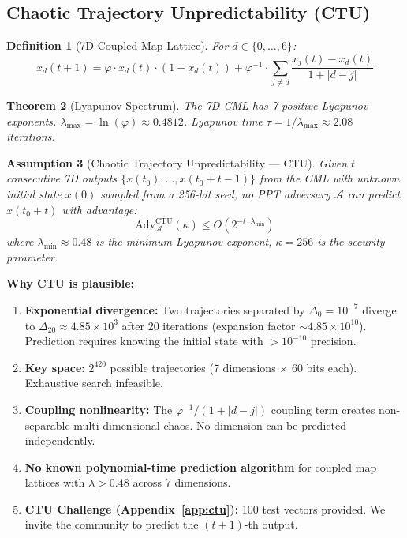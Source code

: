 \documentclass[11pt,a4paper]{article}
\newtheorem{theorem}{Theorem}[section]
\newtheorem{definition}[theorem]{Definition}
\newtheorem{assumption}[theorem]{Assumption}
\begin{document}
\subsection{Chaotic Trajectory Unpredictability (CTU)}

\begin{definition}[7D Coupled Map Lattice]
For $d \in \{0, \ldots, 6\}$:
\[
x_d(t+1) = \varphi \cdot x_d(t) \cdot (1 - x_d(t)) + \varphi^{-1} \cdot \sum_{j \neq d} \frac{x_j(t) - x_d(t)}{1 + |d - j|}
\]
\end{definition}

\begin{theorem}[Lyapunov Spectrum]
The 7D CML has 7 positive Lyapunov exponents. $\lambda_{\max} = \ln(\varphi) \approx 0.4812$. Lyapunov time $\tau = 1/\lambda_{\max} \approx 2.08$ iterations.
\end{theorem}

\begin{assumption}[Chaotic Trajectory Unpredictability --- CTU]
\label{ass:ctu}
Given $t$ consecutive 7D outputs $\{x(t_0), \ldots, x(t_0 + t - 1)\}$ from the CML with unknown initial state $x(0)$ sampled from a 256-bit seed, no PPT adversary $\mathcal{A}$ can predict $x(t_0 + t)$ with advantage:
\[
\text{Adv}^{\text{CTU}}_{\mathcal{A}}(\kappa) \leq O(2^{-t \cdot \lambda_{\min}})
\]
where $\lambda_{\min} \approx 0.48$ is the minimum Lyapunov exponent, $\kappa = 256$ is the security parameter.
\end{assumption}

\textbf{Why CTU is plausible:}
\begin{enumerate}
\item \textbf{Exponential divergence:} Two trajectories separated by $\Delta_0 = 10^{-7}$ diverge to $\Delta_{20} \approx 4.85 \times 10^3$ after 20 iterations (expansion factor $\sim 4.85 \times 10^{10}$). Prediction requires knowing the initial state with $>10^{-10}$ precision.
\item \textbf{Key space:} $2^{420}$ possible trajectories (7 dimensions $\times$ 60 bits each). Exhaustive search infeasible.
\item \textbf{Coupling nonlinearity:} The $\varphi^{-1}/(1+|d-j|)$ coupling term creates non-separable multi-dimensional chaos. No dimension can be predicted independently.
\item \textbf{No known polynomial-time prediction algorithm} for coupled map lattices with $\lambda > 0.48$ across 7 dimensions.
\item \textbf{CTU Challenge (Appendix~\ref{app:ctu}):} 100 test vectors provided. We invite the community to predict the $(t+1)$-th output.
\end{enumerate}
\end{document}
